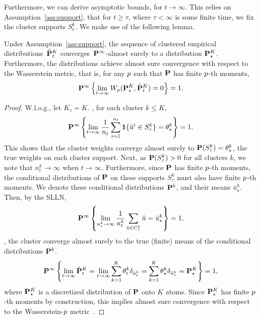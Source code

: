 Furthermore, we can derive asymptotic bounds, for $t \to \infty$. 
This relies on Assumption~\ref{ass:support}, that for $t \geq \tau$, where $\tau < \infty$ is some finite time, we fix the cluster supports $S_t^k$. We make use of the following lemma. 
\begin{lemma}
\label{lem:cluster_converge}
Under Assumption~\ref{ass:support}, the sequence of clustered empirical distributions~$\hat{{\mathbf P}}^K_t$ converges~${\mathbf P}^\infty$-almost surely to a distribution ${\mathbf P}^K_\star$. Furthermore, the distributions achieve almost sure convergence with respect to the Wasserstein metric, that is, for any $p$ such that ${\mathbf P}$ has finite $p$-th moments,
    $${\mathbf P}^{\infty} \left \{ \lim_{t \to \infty} W_{p}({\mathbf P}^K_\star, \hat{{\mathbf P}}^K_t) = 0\right\} = 1.$$
\end{lemma}
\begin{proof}
W.l.o.g., let $K_\tau = K$. 
, for each cluster $k \leq K$,
    $${\mathbf P}^\infty\left\{ \lim_{t\to\infty}\frac{1}{n_t} \sum_{i=1}^{n_t}\mathbf{1}\{\hat{u}^i \in S^k_\tau\} = \theta_\star^k\right\}=1. $$
     This shows that the cluster weights converge almost surely to ${\mathbf P}(S^k_\tau) = \theta_\star^k$, the true weights on each cluster support. 
Next, as ${\mathbf P}(S^k_\tau) >0$ for all clusters $k$, we note that $n^k_t \to \infty$ when $t \to \infty$. 
Furthermore, since ${\mathbf P}$ has finite $p$-th moments, the conditional distributions of ${\mathbf P}$ on these supports $S^k_\tau$ must also have finite $p$-th moments. We denote these conditional distributions ${\mathbf P}^k$, and their means $\bar{u}^k_\star$. Then, by the SLLN,
$${\mathbf P}^\infty\left\{ \lim_{n_t^k\to\infty} \frac{1}{n_t^k} \sum_{\hat{u} \in C^k_\tau}\hat{u} = \bar{u}^k_\star\right\} = 1,$$
 \ie, the cluster  converge almost surely to the true (finite) means of the conditional distributions ${\mathbf P}^k$.
 $${\mathbf P}^\infty\left\{ \lim_{t\to\infty} \hat{{\mathbf P}}^K_t =\lim_{t\to\infty}\sum_{k=1}^K\theta^k_t\delta_{\bar{u}_t^k} = \sum_{k=1}^K\theta^k_\star\delta_{\bar{u}_\star^k} ={\mathbf P}^K_\star\right\} = 1, $$
 where ${\mathbf P}^K_\star$ is  a discretized distribution of ${\mathbf P}$ onto $K$ atoms. 
 Since ${\mathbf P}^K_\star$ has finite $p$-th moments by construction, this implies almost sure convergence with respect to the Wasserstein-$p$ metric~\cite[Theorem 6.9]{optimal_transport_wass}.
\end{proof}

